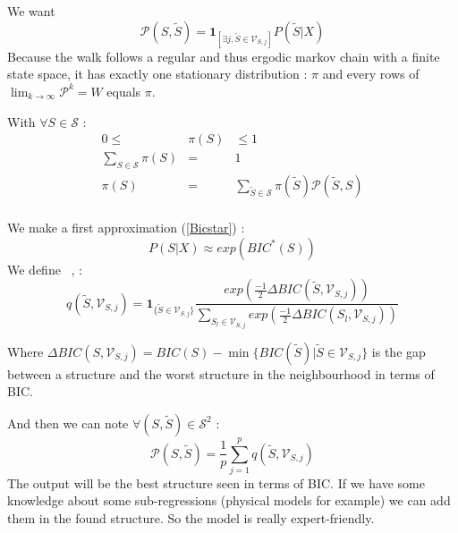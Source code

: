 \documentclass[11pt,a4paper]{article}
\begin{document}
We want 
		\begin{equation}
			\mathcal{P}(S,\tilde{S})=\mathbf{1}_{[\exists j, \tilde{S} \in \mathcal{V}_{S,j} ]} P(\tilde{S}|X)
		\end{equation}
			Because the walk follows a regular and thus ergodic markov chain with a finite state space, it has exactly one stationary distribution \cite{grinstead1997introduction} : $\pi$ and every rows of $\operatorname{lim}_{k\rightarrow \infty}\mathcal{P}^k=W$ equals $\pi$.
	
	
	With $\forall S \in  \mathcal{S}$ :
	\begin{eqnarray}		
		0 \leq &\pi (S)& \leq 1 \nonumber \\
		\sum_{S \in \mathcal{S}}\pi(S) &=&1 \nonumber \\
		\pi (S) &=&\sum_{\tilde{S}\in \mathcal{S}} \pi(\tilde{S})\mathcal{P}(\tilde{S},S) \\%
	\end{eqnarray}
		
	We make a first approximation (\ref{Bicstar}) : 
	\begin{equation}
		P(S|X)\approx exp(BIC^*(S))
	\end{equation}
	We define ~\cite{BIChuard}, :
	\begin{equation}
		q(\tilde{S},\mathcal{V}_{S,j})=\mathbf{1}_{ \{\tilde{S}\in \mathcal{V}_{S,j}\} }\frac{exp(\frac{-1}{2}\Delta BIC(\tilde{S},\mathcal{V}_{S,j}))}{\sum_{S_l\in \mathcal{V}_{S,j}}exp(\frac{-1}{2}\Delta BIC(S_l,\mathcal{V}_{S,j}))}
	\end{equation}
	
	Where $\Delta BIC(S,\mathcal{V}_{S,j})=BIC(S)-\min\{BIC(\tilde{S})| \tilde{S} \in \mathcal{V}_{S,j} \} $ is the gap between a structure and the worst structure in the neighbourhood in terms of BIC.
	\newline
	
	 And then we can note $\forall (S,\tilde{S}) \in \mathcal{S}^2 $ :
		\begin{displaymath}
			\mathcal{P}(S,\tilde{S})= \frac{1}{p} \sum_{j=1}^p q(\tilde{S},\mathcal{V}_{S,j})
		\end{displaymath}
	The output will be the best structure seen in terms of BIC. If we have some knowledge about some sub-regressions (physical models for example) we can add them in the found structure. So the model is really expert-friendly.
\end{document}
